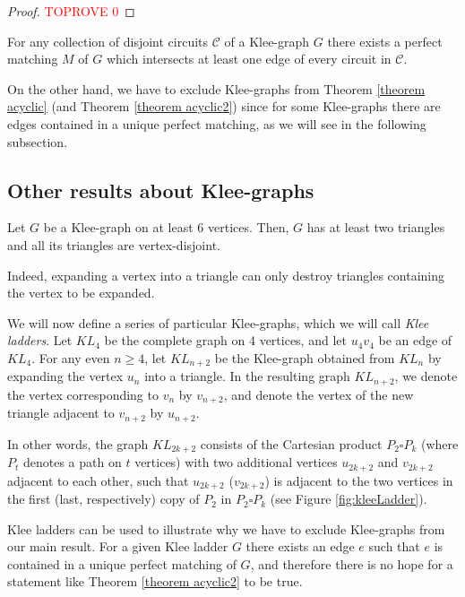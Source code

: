 \documentclass[]{theclass}
\begin{document}
\begin{proof}\textcolor{red}{TOPROVE 0}\end{proof}

\begin{corollary}\label{cor klee collection}
For any collection of disjoint circuits $\mathcal{C}$ of a Klee-graph $G$ there exists a perfect matching $M$ of $G$ which intersects at least one edge of every circuit in $\mathcal{C}$.
\end{corollary}

On the other hand, we have to exclude Klee-graphs from Theorem \ref{theorem acyclic} (and Theorem \ref{theorem acyclic2}) since for some Klee-graphs there are edges contained in a unique perfect matching, as we will see in the following subsection.

\subsection{Other results about Klee-graphs}\label{subsection klee}

\begin{lemma}\label{lemma 2 disjoint triangles klee}
Let $G$ be a Klee-graph on at least 6 vertices. Then, $G$ has at least two triangles and all its triangles are vertex-disjoint.
\end{lemma}

Indeed, expanding a vertex into a triangle can only destroy triangles containing the vertex to be expanded. 

We will now define a series of particular Klee-graphs, which we will call \emph{Klee ladders}. Let $KL_4$ be the complete graph on 4 vertices, and let $u_4v_4$ be an edge of $KL_4$. For any even $n\ge 4$, let $KL_{n+2}$ be the Klee-graph obtained from $KL_n$ by expanding the vertex $u_n$ into a triangle. In the resulting graph $KL_{n+2}$, we denote the vertex corresponding to $v_n$ by $v_{n+2}$, and denote the vertex of the new triangle adjacent to $v_{n+2}$ by $u_{n+2}$.

In other words, the graph $KL_{2k+2}$ consists of the Cartesian product $P_2 \square P_k$ (where $P_t$ denotes a path on $t$ vertices) with two additional vertices $u_{2k+2}$ and $v_{2k+2}$ adjacent to each other, such that $u_{2k+2}$ ($v_{2k+2}$) is adjacent to the two vertices in the first (last, respectively) copy of $P_2$ in $P_2 \square P_k$ (see Figure \ref{fig:kleeLadder}).

Klee ladders can be used to illustrate why we have to exclude Klee-graphs from our main result. For a given Klee ladder $G$ there exists an edge $e$ such that $e$ is contained in a unique perfect matching of $G$, and therefore there is no hope for a statement like Theorem \ref{theorem acyclic2} to be true.
\end{document}
